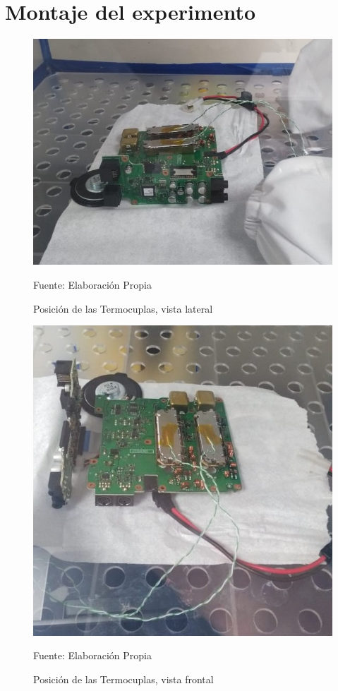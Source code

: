 \chapter{Montaje del experimento}

\begin{figure}[H]
\centering
\includegraphics[scale=0.6]{Figuras/Montaje_2.jpeg}
\caption{Posición de las Termocuplas, vista lateral}
Fuente: Elaboración Propia
\label{anexo12}
\end{figure}

\begin{figure}[H]
\centering
\includegraphics[scale=0.5]{Figuras/Montaje_3.jpeg}
\caption{Posición de las Termocuplas, vista frontal}
Fuente: Elaboración Propia
\label{anexo13}
\end{figure}


